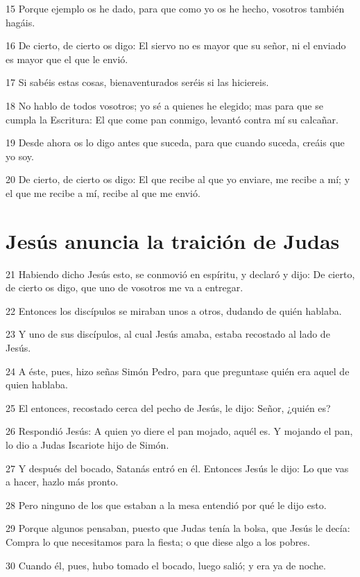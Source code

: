 \par 15 Porque ejemplo os he dado, para que como yo os he hecho, vosotros también hagáis.
\par 16 De cierto, de cierto os digo: El siervo no es mayor que su señor, ni el enviado es mayor que el que le envió.
\par 17 Si sabéis estas cosas, bienaventurados seréis si las hiciereis.
\par 18 No hablo de todos vosotros; yo sé a quienes he elegido; mas para que se cumpla la Escritura: El que come pan conmigo, levantó contra mí su calcañar.
\par 19 Desde ahora os lo digo antes que suceda, para que cuando suceda, creáis que yo soy.
\par 20 De cierto, de cierto os digo: El que recibe al que yo enviare, me recibe a mí; y el que me recibe a mí, recibe al que me envió.

\section*{Jesús anuncia la traición de Judas}

\par 21 Habiendo dicho Jesús esto, se conmovió en espíritu, y declaró y dijo: De cierto, de cierto os digo, que uno de vosotros me va a entregar.
\par 22 Entonces los discípulos se miraban unos a otros, dudando de quién hablaba.
\par 23 Y uno de sus discípulos, al cual Jesús amaba, estaba recostado al lado de Jesús.
\par 24 A éste, pues, hizo señas Simón Pedro, para que preguntase quién era aquel de quien hablaba.
\par 25 El entonces, recostado cerca del pecho de Jesús, le dijo: Señor, ¿quién es?
\par 26 Respondió Jesús: A quien yo diere el pan mojado, aquél es. Y mojando el pan, lo dio a Judas Iscariote hijo de Simón.
\par 27 Y después del bocado, Satanás entró en él. Entonces Jesús le dijo: Lo que vas a hacer, hazlo más pronto.
\par 28 Pero ninguno de los que estaban a la mesa entendió por qué le dijo esto.
\par 29 Porque algunos pensaban, puesto que Judas tenía la bolsa, que Jesús le decía: Compra lo que necesitamos para la fiesta; o que diese algo a los pobres.
\par 30 Cuando él, pues, hubo tomado el bocado, luego salió; y era ya de noche.

